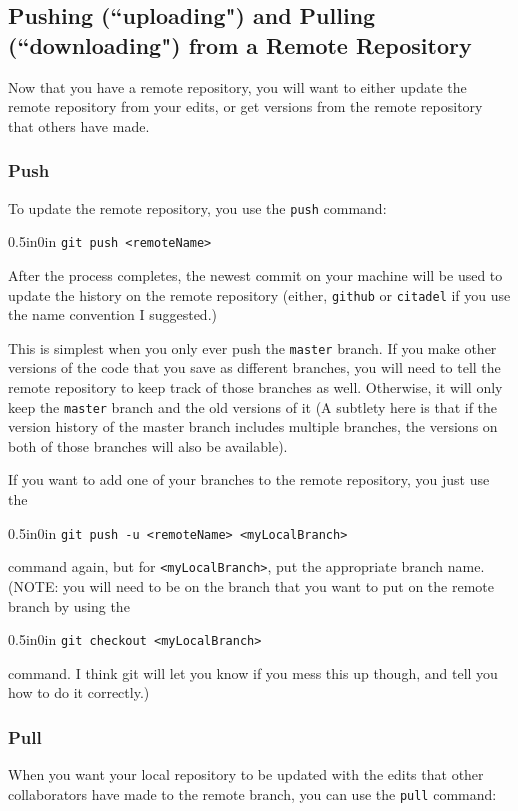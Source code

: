 \documentclass[11pt]{article}
\newcommand{\code}[1]{\begin{adjustwidth}{0.5in}{0in}
    \texttt{#1}
    \end{adjustwidth}}
\begin{document}
\subsection{Pushing (``uploading") and Pulling (``downloading") from a Remote Repository}

Now that you have a remote repository, you will want to either update the remote repository from your edits, or get versions from the remote repository that others have made.

\subsubsection{Push}
To update the remote repository, you use the \texttt{push} command:

\code{git push <remoteName>}

After the process completes, the newest commit on your machine will be used to update the history on the remote repository (either, \texttt{github} or \texttt{citadel} if you use the name convention I suggested.)

This is simplest when you only ever push the \texttt{master} branch.  If you make other versions of the code that you save as different branches, you will need to tell the remote repository to keep track of those branches as well.  Otherwise, it will only keep the \texttt{master} branch and the old versions of it (A subtlety here is that if the version history of the master branch includes multiple branches, the versions on both of those branches will also be available).

If you want to add one of your branches to the remote repository, you just use the 

\code{git push -u <remoteName> <myLocalBranch>}  

command again, but for \texttt{<myLocalBranch>}, put the appropriate branch name.  (NOTE: you will need to be on the branch that you want to put on the remote branch by using the \code{git checkout <myLocalBranch>} command.  I think git will let you know if you mess this up though, and tell you how to do it correctly.)

\subsubsection{Pull}

When you want your local repository to be updated with the edits that other collaborators have made to the remote branch, you can use the \texttt{pull} command:
\end{document}

